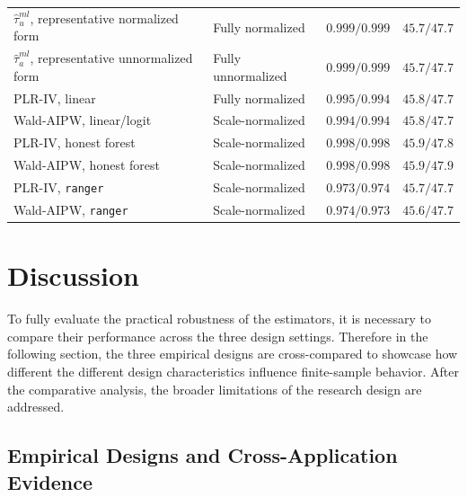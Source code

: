 \documentclass[12pt, a4paper, oneside]{article}
\theoremstyle{plain}
\theoremstyle{definition}
\begin{document}
\begin{table}[H]
\begin{tabular}{llcc}
\shortstack[l]{\(\widehat{\tau}^{ml}_{u}\), representative\\normalized form}
    & Fully normalized
    & \(0.999/0.999\) & \(45.7/47.7\) \\
\shortstack[l]{\(\widehat{\tau}^{ml}_{a}\), representative\\unnormalized form}
    & Fully unnormalized
    & \(0.999/0.999\) & \(45.7/47.7\) \\
PLR-IV, linear
    & Fully normalized
    & \(0.995/0.994\) & \(45.8/47.7\) \\
Wald-AIPW, linear/logit
    & Scale-normalized
    & \(0.994/0.994\) & \(45.8/47.7\) \\
PLR-IV, honest forest
    & Scale-normalized
    & \(0.998/0.998\) & \(45.9/47.8\) \\
Wald-AIPW, honest forest
    & Scale-normalized
    & \(0.998/0.998\) & \(45.9/47.9\) \\
PLR-IV, \texttt{ranger}
    & Scale-normalized
    & \(0.973/0.974\) & \(45.7/47.7\) \\
Wald-AIPW, \texttt{ranger}
    & Scale-normalized
    & \(0.974/0.973\) & \(45.6/47.7\) \\
\bottomrule
\end{tabular}


\end{table}




\section{Discussion}
\label{sec:discussion}
To fully evaluate the practical robustness of the estimators, it is necessary to compare their performance across
the three design settings.
Therefore in the following section,
the three empirical designs are cross-compared to showcase how different the different design characteristics influence finite-sample behavior.
After the comparative analysis, the broader limitations of the research design are addressed.

\subsection{Empirical Designs and Cross-Application Evidence}
\label{subsec:cross_application}
\end{document}
